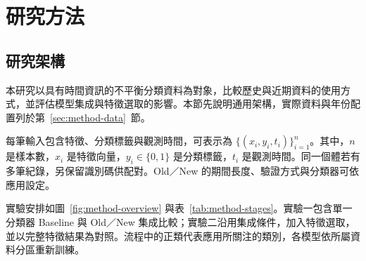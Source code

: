 \chapter{研究方法}\label{chap:method}
\begingroup
\setlength{\emergencystretch}{2em}

\section{研究架構}\label{sec:method-framework}

本研究以具有時間資訊的不平衡分類資料為對象，比較歷史與近期資料的使用方式，並評估模型集成與特徵選取的影響。本節先說明通用架構，實際資料與年份配置列於第~\ref{sec:method-data}~節。

每筆輸入包含特徵、分類標籤與觀測時間，可表示為 \(\{(x_i,y_i,t_i)\}_{i=1}^{n}\)。其中，\(n\) 是樣本數，\(x_i\) 是特徵向量，\(y_i\in\{0,1\}\) 是分類標籤，\(t_i\) 是觀測時間。同一個體若有多筆紀錄，另保留識別碼供配對。Old／New 的期間長度、驗證方式與分類器可依應用設定。

實驗安排如圖~\ref{fig:method-overview} 與表~\ref{tab:method-stages}。實驗一包含單一分類器 Baseline 與 Old／New 集成比較；實驗二沿用集成條件，加入特徵選取，並以完整特徵結果為對照。流程中的正類代表應用所關注的類別，各模型依所屬資料分區重新訓練。

